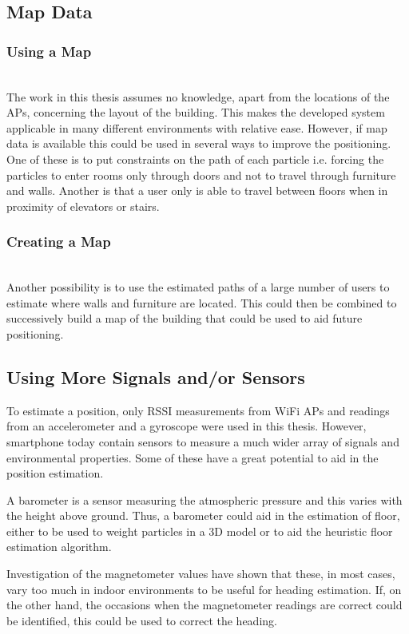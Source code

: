 \documentclass{LTHthesis}
\begin{document}
\subsection{Map Data}
\subsubsection{Using a Map}~\\
%
The work in this thesis assumes no knowledge, apart from the locations of the APs, concerning the layout of the building. This makes the developed system applicable in many different environments with relative ease. However, if map data is available this could be used in several ways to improve the positioning. One of these is to put constraints on the path of each particle i.e. forcing the particles to enter rooms only through doors and not to travel through furniture and walls. Another is that a user only is able to travel between floors when in proximity of elevators or stairs. 
%  
\subsubsection{Creating a Map}~\\
%
Another possibility is to use the estimated paths of a large number of users to estimate where walls and furniture are located. This could then be combined to successively build a map of the building that could be used to aid future positioning. 
%
\subsection{Using More Signals and/or Sensors}
%
To estimate a position, only RSSI measurements from WiFi APs and readings from an accelerometer and a gyroscope were used in this thesis. However, smartphone today contain sensors to measure a much wider array of signals and environmental properties. Some of these have a great potential to aid in the position estimation.

A barometer is a sensor measuring the atmospheric pressure and this varies with the height above ground. Thus, a barometer could aid in the estimation of floor, either to be used to weight particles in a 3D model or to aid the heuristic floor estimation algorithm.

Investigation of the magnetometer values have shown that these, in most cases, vary too much in indoor environments to be useful for heading estimation. If, on the other hand, the occasions when the magnetometer readings are correct could be identified, this could be used to correct the heading.
\end{document}

